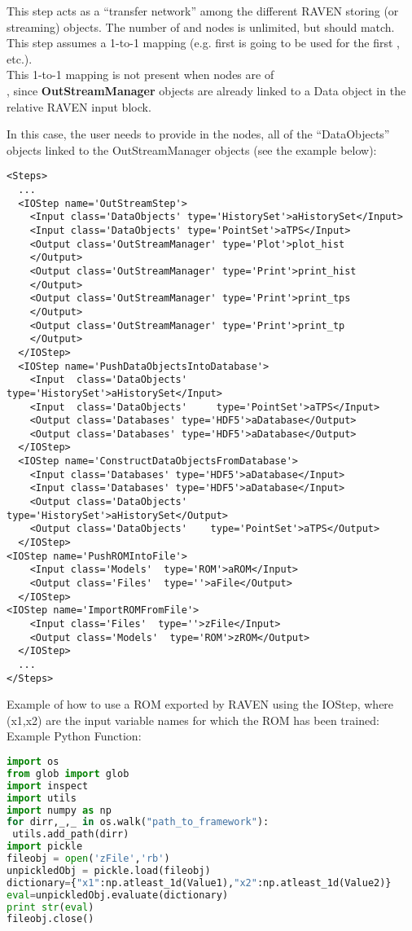 This step acts as a ``transfer network'' among the different RAVEN storing
(or streaming) objects.
%
The number of  and  nodes is unlimited, but
should match.
%
This step assumes a 1-to-1 mapping (e.g. first  is going to be
used for the first , etc.).
\\
\nb This 1-to-1 mapping is not present when  nodes are of
\\, since  \textbf{OutStreamManager}
objects are already linked to a Data object in the relative RAVEN input block.

In this case, the user needs to provide in the  nodes, all of the 
``DataObjects'' objects linked to the OutStreamManager objects (see the example 
below):
\begin{lstlisting}[style=XML,morekeywords={class}]
<Steps>
  ...
  <IOStep name='OutStreamStep'>
    <Input class='DataObjects' type='HistorySet'>aHistorySet</Input>
    <Input class='DataObjects' type='PointSet'>aTPS</Input>
    <Output class='OutStreamManager' type='Plot'>plot_hist
    </Output>
    <Output class='OutStreamManager' type='Print'>print_hist
    </Output>
    <Output class='OutStreamManager' type='Print'>print_tps
    </Output>
    <Output class='OutStreamManager' type='Print'>print_tp
    </Output>
  </IOStep>
  <IOStep name='PushDataObjectsIntoDatabase'>
    <Input  class='DataObjects'     type='HistorySet'>aHistorySet</Input>
    <Input  class='DataObjects'     type='PointSet'>aTPS</Input>
    <Output class='Databases' type='HDF5'>aDatabase</Output>
    <Output class='Databases' type='HDF5'>aDatabase</Output>
  </IOStep>
  <IOStep name='ConstructDataObjectsFromDatabase'>
    <Input class='Databases' type='HDF5'>aDatabase</Input>
    <Input class='Databases' type='HDF5'>aDatabase</Input>
    <Output class='DataObjects'    type='HistorySet'>aHistorySet</Output>
    <Output class='DataObjects'    type='PointSet'>aTPS</Output>
  </IOStep>
<IOStep name='PushROMIntoFile'>
    <Input class='Models'  type='ROM'>aROM</Input>
    <Output class='Files'  type=''>aFile</Output>
  </IOStep>
<IOStep name='ImportROMFromFile'>
    <Input class='Files'  type=''>zFile</Input>
    <Output class='Models'  type='ROM'>zROM</Output>
  </IOStep>
  ...
</Steps>
\end{lstlisting}
%
Example of how to use a ROM exported by RAVEN using the IOStep, 
where (x1,x2) are the input variable names for which the ROM has been trained: 
%
Example Python Function:
\begin{lstlisting}[language=python]
import os
from glob import glob
import inspect
import utils
import numpy as np
for dirr,_,_ in os.walk("path_to_framework"):
 utils.add_path(dirr)
import pickle
fileobj = open('zFile','rb')
unpickledObj = pickle.load(fileobj)
dictionary={"x1":np.atleast_1d(Value1),"x2":np.atleast_1d(Value2)}
eval=unpickledObj.evaluate(dictionary)
print str(eval)
fileobj.close()
\end{lstlisting}

